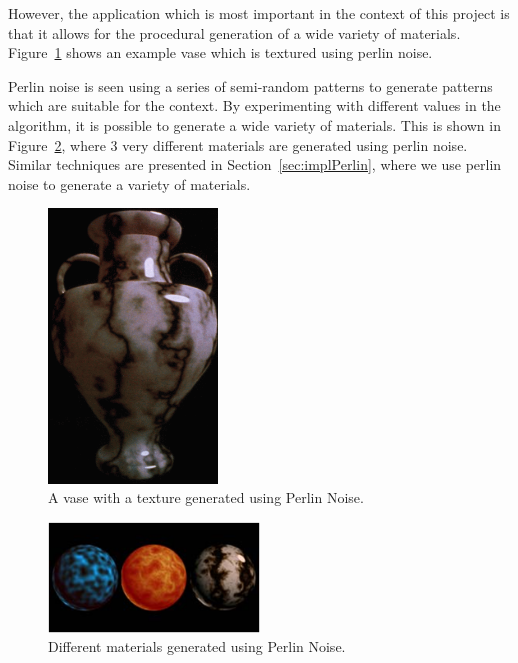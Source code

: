 However, the application which is most important in the context of this project is that it allows for the procedural generation of a wide variety of materials.
Figure~\ref{fig:perlinvase} shows an example vase which is textured using perlin noise.

Perlin noise is seen using a series of semi-random patterns to generate patterns which are suitable for the context.
By experimenting with different values in the algorithm, it is possible to generate a wide variety of materials.
This is shown in Figure~\ref{fig:perlinmaterials}, where 3 very different materials are generated using perlin noise.
Similar techniques are presented in Section~\ref{sec:implPerlin}, where we use perlin noise to generate a variety of materials.

\begin{figure}
  \centering
  \includegraphics[width=0.4\textwidth]{images/perlinvase}
  \caption{A vase with a texture generated using Perlin Noise. \cite{web:perlinvase}}
  \label{fig:perlinvase}
\end{figure}


\begin{figure}
  \centering
  \includegraphics[width=0.5\textwidth]{images/perlinmaterials}
  \caption{Different materials generated using Perlin Noise.}
  \label{fig:perlinmaterials}
\end{figure}


